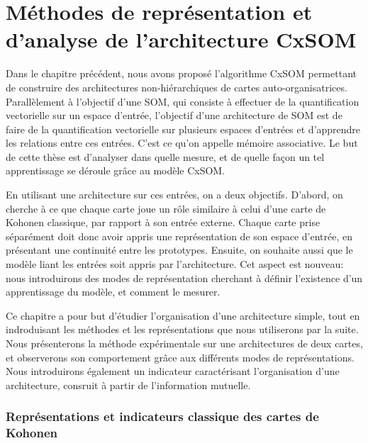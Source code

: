 \chapter{Méthodes de représentation et d'analyse de l'architecture CxSOM}
\graphicspath{{03-Representation/}}
\minitoc

Dans le chapitre précédent, nous avons proposé l'algorithme CxSOM permettant de construire des architectures non-hiérarchiques de cartes auto-organisatrices.
Parallèlement à l'objectif d'une SOM, qui consiste à effectuer de la quantification vectorielle sur un espace d'entrée, l'objectif d'une architecture de SOM est de faire de la quantification vectorielle sur plusieurs espaces d'entrées et d'apprendre les relations entre ces entrées.
C'est ce qu'on appelle mémoire associative. Le but de cette thèse est d'analyser dans quelle mesure, et de quelle façon un tel apprentissage se déroule grâce au modèle CxSOM.

En utilisant une architecture sur ces entrées, on a deux objectifs. D'abord, on cherche à ce que chaque carte joue un rôle similaire à celui d'une carte de Kohonen classique, par rapport à son entrée externe.
Chaque carte prise séparément doit donc avoir appris une représentation de son espace d'entrée, en présentant une continuité entre les prototypes.
Ensuite, on souhaite aussi que le modèle liant les entrées soit appris par l'architecture. Cet aspect est nouveau:
nous introduirons des modes de représentation cherchant à définir l'existence d'un apprentissage du modèle, et comment le mesurer.

Ce chapitre a pour but d'étudier l'organisation d'une architecture simple, tout en indroduisant les méthodes et les représentations que nous utiliserons par la suite.
Nous présenterons la méthode expérimentale sur une architectures de deux cartes, et observerons son comportement grâce aux différents modes de représentations.
Nous introduirons également un indicateur caractérisant l'organisation d'une architecture, consruit à partir de l'information mutuelle.


\subsection{Représentations et indicateurs classique des cartes de Kohonen}

